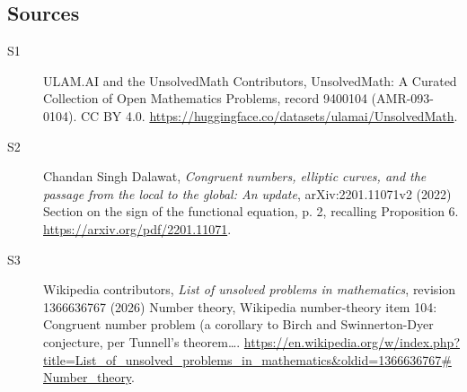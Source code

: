 \documentclass[11pt]{article}
\begin{document}
\subsection{Sources}
\begin{description}
\item[\hypertarget{source:9400104:1}{S1}] ULAM.AI and the UnsolvedMath Contributors, UnsolvedMath: A Curated Collection of Open Mathematics Problems, record 9400104 (AMR-093-0104). CC BY 4.0. \url{https://huggingface.co/datasets/ulamai/UnsolvedMath}.
\item[\hypertarget{source:9400104:2}{S2}] Chandan Singh Dalawat, \emph{Congruent numbers, elliptic curves, and the passage from the local to the global: An update}, arXiv:2201.11071v2 (2022) Section on the sign of the functional equation, p. 2, recalling Proposition 6. \url{https://arxiv.org/pdf/2201.11071}.
\item[\hypertarget{source:9400104:3}{S3}] Wikipedia contributors, \emph{List of unsolved problems in mathematics}, revision 1366636767 (2026) Number theory, Wikipedia number-theory item 104: Congruent number problem (a corollary to Birch and Swinnerton-Dyer conjecture, per Tunnell's theorem…. \url{https://en.wikipedia.org/w/index.php?title=List_of_unsolved_problems_in_mathematics&oldid=1366636767#Number_theory}.
\end{description}
\label{end:9400104}
\end{document}
